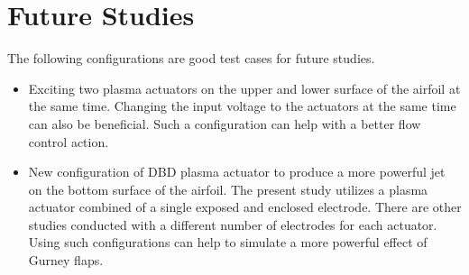 \documentclass[fleqn,10pt]{SelfArx} %
\begin{document}
\section{Future Studies}
The following configurations are good test cases for future studies.
\begin{itemize}
\item Exciting two plasma actuators on the upper and lower surface of the airfoil at the same time. Changing the input voltage to the actuators at the same time can also be beneficial. Such a configuration can help with a better flow control action.
\item New configuration of DBD plasma actuator to produce a more powerful jet on the bottom surface of the airfoil. The present study utilizes a plasma actuator combined of a single exposed and enclosed electrode. There are other studies conducted with a different number of electrodes for each actuator. Using such configurations can help to simulate a more powerful effect of Gurney flaps.
\end{itemize}


















\onecolumn
\clearpage
\end{document}
